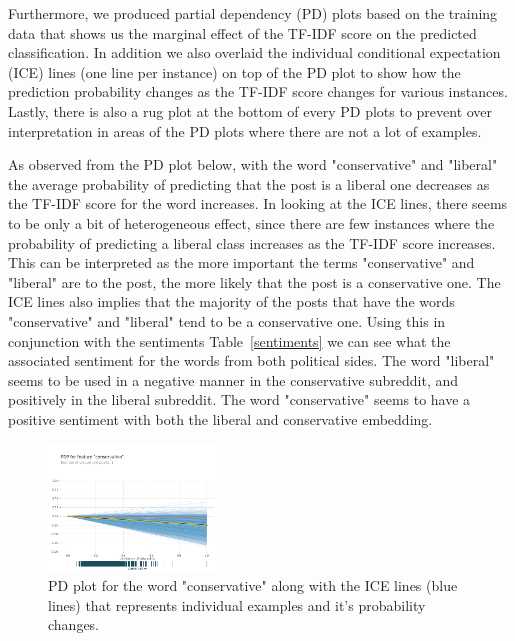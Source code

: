 \documentclass[conference]{IEEEtran}
\begin{document}
Furthermore, we produced partial dependency (PD) plots  based on the training data that shows us the marginal effect of the TF-IDF score on the predicted classification. In addition we also overlaid the individual conditional expectation (ICE)  lines (one line per instance) on top of the PD plot to show how the prediction probability changes as the TF-IDF score changes for various instances. Lastly, there is also a rug plot at the bottom of every PD plots to prevent over interpretation in areas of the PD plots where there are not a lot of examples.

As observed from the PD plot below, with the word "conservative" and "liberal" the average probability of predicting that the post is a liberal one decreases as the TF-IDF score for the word increases. In looking at the ICE lines, there seems to be only a bit of heterogeneous effect, since there are few instances where the probability of predicting a liberal class increases as the TF-IDF score increases. This can be interpreted as the more important the terms "conservative" and "liberal"  are to the post, the more likely that the post is a conservative one. The ICE lines also implies that the majority of the posts that have the words "conservative" and "liberal" tend to be a conservative one. Using this in conjunction with the sentiments Table~\ref{sentiments} we can see what the associated sentiment for the words from both political sides. The word "liberal" seems to be used in a negative manner in the conservative subreddit, and positively in the liberal subreddit. The word "conservative" seems to have a positive sentiment with both the liberal and conservative embedding.

\begin{figure}[tb]
    \centering
    \includegraphics[width=0.4\textwidth]{conservative_pdp.pdf}
    \vspace{-2mm}
    \caption{PD plot for the word "conservative" along with the ICE lines (blue lines) that represents individual examples and it's probability changes.}
    \label{fig:conservative_pdp}
    \vspace{-5mm}
\end{figure}
\end{document}
